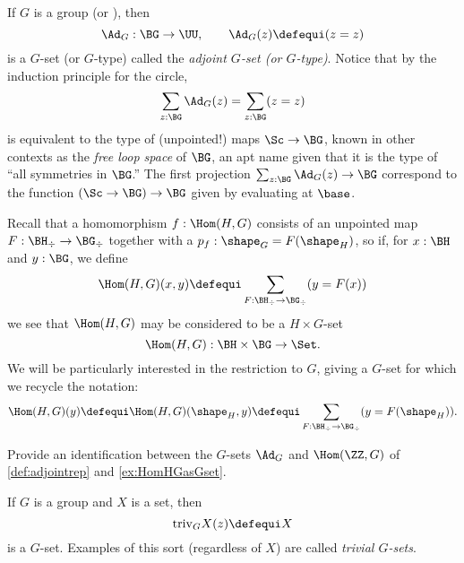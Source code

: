 \begin{example}\label{def:adjointrep}
  If $G$ is a group (or \inftygp), then
$$\Ad_G:\BG\to\UU,\qquad\Ad_G(z)\defequi(z=z)$$ is a $G$-set (or $G$-type) called the \emph{adjoint $G$-set (or $G$-type)}.
Notice that by the induction principle for the circle,
$$\sum_{z:\BG}\Ad_G(z)=\sum_{z:\BG}(z=z)$$
is equivalent to the type of (unpointed!) maps $\Sc\to\BG$, known in other contexts as the \emph{free loop space} of $\BG$, an apt name given that it is the type of ``all symmetries in $\BG$.''
The first projection $\sum_{z:\BG}\Ad_G(z)\to \BG$ correspond to the function $(\Sc\to\BG)\to\BG$ given by evaluating at $\base$.
\end{example}
\begin{example}
  \label{ex:HomHGasGset}
  Recall that a homomorphism $f:\Hom(H,G)$ consists of an unpointed map $F:\BH_\div\to \BG_\div$ together with a $p_f:\shape_G=F(\shape_H)$, so if, for $x:\BH$ and $y:\BG$, we define
$$\Hom(H,G)(x,y)\defequi\sum_{F:\BH_\div\to \BG_\div}(y=F(x))$$
we see that $\Hom(H,G)$ may be considered to be a $H\times G$-set
$$\Hom(H,G) : \BH\times \BG\to\Set.$$
We will be particularly interested in the restriction to $G$, giving a $G$-set for which we recycle the notation:
$$\Hom(H,G)(y)\defequi\Hom(H,G)(\shape_H,y)\defequi \sum_{F:\BH_\div\to \BG_\div}(y=F(\shape_H)).$$
\end{example}
\begin{xca}
  \label{xca:HomZGvsAdG}
  Provide an identification between the $G$-sets
$\Ad_G$  and $\Hom(\ZZ,G)$
of \cref{def:adjointrep} and \cref{ex:HomHGasGset}.
\end{xca}


\begin{example}\label{def:trivGset}
  If $G$ is a group and $X$ is a set, then
$$\mathrm{triv}_GX(z)\defequi X$$ is a $G$-set.
Examples of this sort (regardless of $X$) are called \emph{trivial $G$-sets}.
\end{example}

